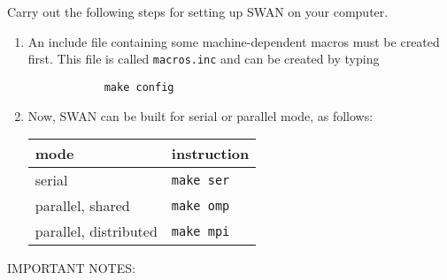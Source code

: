 \documentclass[12pt]{book}
\begin{document}
Carry out the following steps for setting up SWAN on your computer.
\begin{enumerate}
  \item An include file containing some machine-dependent macros must be created first.
        This file is called {\tt macros.inc} and can be created by typing
        \begin{verbatim}
            make config
        \end{verbatim}
  \item Now, SWAN can be built for serial or parallel mode, as follows:
        \begin{table}[htb]
           \begin{center}
           \begin{tabular}{|l|l|}
              \hline
              {\bf mode}            & {\bf instruction} \\
              \hline
              serial                & {\tt make ser} \\
              \hline
              parallel, shared      & {\tt make omp} \\
              \hline
              parallel, distributed & {\tt make mpi} \\
              \hline
           \end{tabular}
           \end{center}
        \end{table}
\end{enumerate}
\newpage
\noindent
IMPORTANT NOTES:
\end{document}
